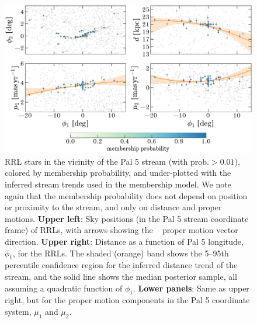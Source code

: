 \documentclass[twocolumn]{aastex63}
\begin{document}
\begin{figure}[t]
\begin{center}
\includegraphics[width=\textwidth]{tracks.pdf}
\caption{RRL stars in the vicinity of the Pal 5 stream (with $\textrm{prob.} > 0.01$), colored by membership probability, and under-plotted with the inferred stream trends used in the membership model.
We note again that the membership probability does not depend on position or proximity to the stream, and only on distance and proper motions.
\textbf{Upper left}: Sky positions (in the Pal 5 stream coordinate frame) of RRLs, with arrows showing the \Gaia\  proper motion vector direction.
\textbf{Upper right}: Distance as a function of Pal 5 longitude, $\phi_1$, for the RRLs. The shaded (orange) band shows the 5--95th percentile confidence region for the inferred distance trend of the stream, and the solid line shows the median posterior sample, all assuming a quadratic function of $\phi_1$.
\textbf{Lower panels}: Same as upper right, but for the proper motion components in the Pal 5 coordinate system, $\mu_1$ and $\mu_2$.
}
\label{fig:trackmembers}
\end{center}
\end{figure}
\end{document}
